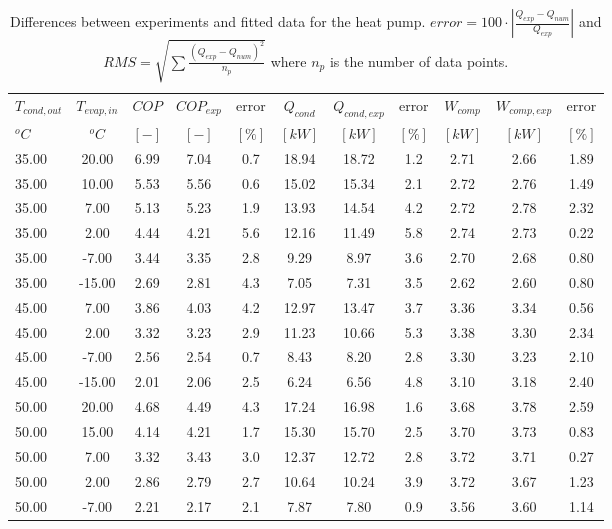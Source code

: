 \documentclass[english]{SPFShortReport}
\begin{document}
\begin{table}[!ht]
\begin{small}
\caption{Differences between experiments and fitted data for the heat pump.          $error=100 \cdot |\frac{Q_{exp}-Q_{num}}{Q_{exp}}|$ and $RMS = \sqrt { \sum{\frac{(Q_{exp}-Q_{num})^2}{n_p}} }$ where $n_p$ is the number of data points.}
\begin{center}
\resizebox{12cm}{!} 
{
\begin{tabular}{l | c c c c c c c c c c } 
\hline
\hline
$T_{cond,out}$ &$T_{evap,in}$ &$COP$ &$COP_{exp}$ &error &$Q_{cond}$ &$Q_{cond,exp}$ &error &$W_{comp}$ &$W_{comp,exp}$ &error \\ 
$^oC$ &$^oC$ &$[-]$ &$[-]$ &$[\%]$ &$[kW]$ &$[kW]$ &$[\%]$ &$[kW]$ &$[kW]$ &$[\%]$\\ 
\hline
35.00  & 20.00 & 6.99 & 7.04 & 0.7 & 18.94 & 18.72 & 1.2 & 2.71 & 2.66 & 1.89\\ 
35.00  & 10.00 & 5.53 & 5.56 & 0.6 & 15.02 & 15.34 & 2.1 & 2.72 & 2.76 & 1.49\\ 
35.00  & 7.00 & 5.13 & 5.23 & 1.9 & 13.93 & 14.54 & 4.2 & 2.72 & 2.78 & 2.32\\ 
35.00  & 2.00 & 4.44 & 4.21 & 5.6 & 12.16 & 11.49 & 5.8 & 2.74 & 2.73 & 0.22\\ 
35.00  & -7.00 & 3.44 & 3.35 & 2.8 & 9.29 & 8.97 & 3.6 & 2.70 & 2.68 & 0.80\\ 
35.00  & -15.00 & 2.69 & 2.81 & 4.3 & 7.05 & 7.31 & 3.5 & 2.62 & 2.60 & 0.80\\ 
45.00  & 7.00 & 3.86 & 4.03 & 4.2 & 12.97 & 13.47 & 3.7 & 3.36 & 3.34 & 0.56\\ 
45.00  & 2.00 & 3.32 & 3.23 & 2.9 & 11.23 & 10.66 & 5.3 & 3.38 & 3.30 & 2.34\\ 
45.00  & -7.00 & 2.56 & 2.54 & 0.7 & 8.43 & 8.20 & 2.8 & 3.30 & 3.23 & 2.10\\ 
45.00  & -15.00 & 2.01 & 2.06 & 2.5 & 6.24 & 6.56 & 4.8 & 3.10 & 3.18 & 2.40\\ 
50.00  & 20.00 & 4.68 & 4.49 & 4.3 & 17.24 & 16.98 & 1.6 & 3.68 & 3.78 & 2.59\\ 
50.00  & 15.00 & 4.14 & 4.21 & 1.7 & 15.30 & 15.70 & 2.5 & 3.70 & 3.73 & 0.83\\ 
50.00  & 7.00 & 3.32 & 3.43 & 3.0 & 12.37 & 12.72 & 2.8 & 3.72 & 3.71 & 0.27\\ 
50.00  & 2.00 & 2.86 & 2.79 & 2.7 & 10.64 & 10.24 & 3.9 & 3.72 & 3.67 & 1.23\\ 
50.00  & -7.00 & 2.21 & 2.17 & 2.1 & 7.87 & 7.80 & 0.9 & 3.56 & 3.60 & 1.14\\ 

\end{tabular}}
\end{center}
\end{small}
\end{table}
\end{document}
